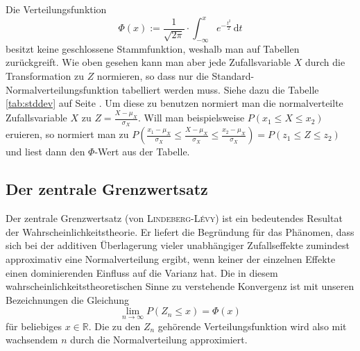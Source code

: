 \documentclass[%
11pt,%
twoside,%
titlepage,%
german,%
headsepline%
]{scrartcl}
\newcounter{theo}[section]\setcounter{theo}{0}
\begin{document}
Die Verteilungsfunktion
$$\Phi(x):=\frac{1}{\sqrt{2\pi}}\cdot\int_{-\infty}^{x} e^{-\frac{t^2}{2}}\,\mathrm{d}t$$
besitzt keine geschlossene Stammfunktion, weshalb man auf Tabellen zurückgreift. Wie oben gesehen kann man aber jede Zufallsvariable $X$ durch die Transformation zu $Z$ normieren, so dass nur die Standard-Normalverteilungsfunktion tabelliert werden muss. Siehe dazu die Tabelle \ref{tab:stddev} auf Seite \pageref{tab:stddev}. Um diese zu benutzen normiert man die normalverteilte Zufallsvariable $X$ zu $Z=\frac{X-\mu_{X}}{\sigma_{X}}$. Will man beispielsweise $P(x_{1}\leq X\leq x_{2})$ eruieren, so normiert man zu $P\left(\frac{x_{1}-\mu_{X}}{\sigma_{X}}\leq\frac{X-\mu_{X}}{\sigma_{X}}\leq \frac{x_{2}-\mu_{X}}{\sigma_{X}}\right)=P(z_{1}\leq Z\leq z_{2})$ und liest dann den $\Phi$-Wert aus der Tabelle.

\subsection{Der zentrale Grenzwertsatz}

Der zentrale Grenzwertsatz (von \textsc{Lindeberg-Lévy}) ist ein bedeutendes Resultat der Wahrscheinlichkeitstheorie. Er liefert die Begründung für das Phänomen, dass sich bei der additiven Überlagerung vieler unabhängiger Zufallseffekte zumindest approximativ eine Normalverteilung ergibt, wenn keiner der einzelnen Effekte einen dominierenden Einfluss auf die Varianz hat. Die in diesem wahrscheinlichkeitstheoretischen Sinne zu verstehende Konvergenz ist mit unseren Bezeichnungen die Gleichung
$$\lim_{n\to\infty} P(Z_n\leq x)=\Phi(x)$$
für beliebiges $x\in\mathbb{R}$.
Die zu den $Z_n$ gehörende Verteilungsfunktion wird also mit wachsendem $n$ durch die Normalverteilung approximiert.

\clearpage
\end{document}
